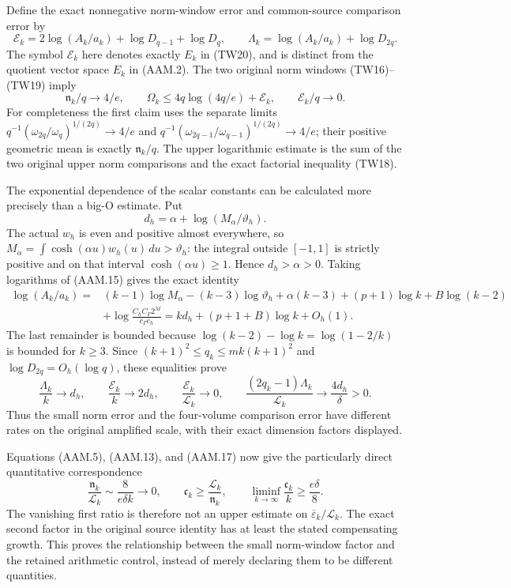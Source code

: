 Define the exact nonnegative norm-window error and common-source
comparison error by
\[
 \mathcal E_k=2\log(A_k/a_k)+\log D_{q-1}+\log D_q,
 \qquad \Lambda_k=\log(A_k/a_k)+\log D_{2q}.
 \tag{AAM.16}
\]
The symbol $\mathcal E_k$ here denotes exactly $E_k$ in (TW20),
and is distinct from the quotient vector space $E_k$ in (AAM.2).
The two original norm windows (TW16)--(TW19) imply
\[
 \mathfrak n_k/q\longrightarrow4/e,
 \qquad \Omega_k\leq4q\log(4q/e)+\mathcal E_k,
 \qquad \mathcal E_k/q\longrightarrow0.
 \tag{AAM.17}
\]
For completeness the first claim uses the separate limits
$q^{-1}(\omega_{2q}/\omega_q)^{1/(2q)}\to4/e$ and
$q^{-1}(\omega_{2q-1}/\omega_{q-1})^{1/(2q)}\to4/e$;
their positive geometric mean is exactly $\mathfrak n_k/q$.
The upper logarithmic estimate is the sum of the two original
upper norm comparisons and the exact factorial inequality (TW18).

The exponential dependence of the scalar constants can be calculated
more precisely than a big-O estimate. Put
\[
 d_h=\alpha+\log(M_\alpha/\vartheta_h).
 \tag{AAM.18}
\]
The actual $w_h$ is even and positive almost everywhere, so
$M_\alpha=\int\cosh(\alpha u)w_h(u)\,du>\vartheta_h$:
the integral outside $[-1,1]$ is strictly positive and on that interval
$\cosh(\alpha u)\geq1$. Hence $d_h>\alpha>0$.
Taking logarithms of (AAM.15) gives the exact identity
\[
 \begin{aligned}
 \log(A_k/a_k)={}&(k-1)\log M_\alpha-(k-3)\log\vartheta_h
       +\alpha(k-3)+(p+1)\log k+B\log(k-2)\\
 &+\log\frac{C_hC_\Gamma2^M}{c_\Gamma c_h}
 =k d_h+(p+1+B)\log k+O_h(1).
 \end{aligned}
 \tag{AAM.19}
\]
The last remainder is bounded because
$\log(k-2)-\log k=\log(1-2/k)$ is bounded for $k\geq3$.
Since $(k+1)^2\leq q_k\leq mk(k+1)^2$ and
$\log D_{2q}=O_h(\log q)$, these equalities prove
\[
 \frac{\Lambda_k}{k}\longrightarrow d_h,\qquad
 \frac{\mathcal E_k}{k}\longrightarrow2d_h,\qquad
 \frac{\mathcal E_k}{\mathcal L_k}\longrightarrow0,
 \qquad
 \frac{(2q_k-1)\Lambda_k}{\mathcal L_k}
                 \longrightarrow\frac{4d_h}{\delta}>0.
 \tag{AAM.20}
\]
Thus the small norm error and the four-volume comparison error have
different rates on the original amplified scale, with their exact
dimension factors displayed.

Equations (AAM.5), (AAM.13), and (AAM.17) now give the particularly
direct quantitative correspondence
\[
 \frac{\mathfrak n_k}{\mathcal L_k}
      \sim\frac{8}{e\delta k}\longrightarrow0,
 \qquad
 \mathfrak c_k\geq\frac{\mathcal L_k}{\mathfrak n_k},
 \qquad
 \liminf_{k\to\infty}\frac{\mathfrak c_k}{k}\geq\frac{e\delta}{8}.
 \tag{AAM.21}
\]
The vanishing first ratio is therefore not an upper estimate on
$\overline\varepsilon_k/\mathcal L_k$. The exact second factor
in the original source identity has at least the stated compensating
growth. This proves the relationship between the small norm-window
factor and the retained arithmetic control, instead of merely declaring
them to be different quantities.

